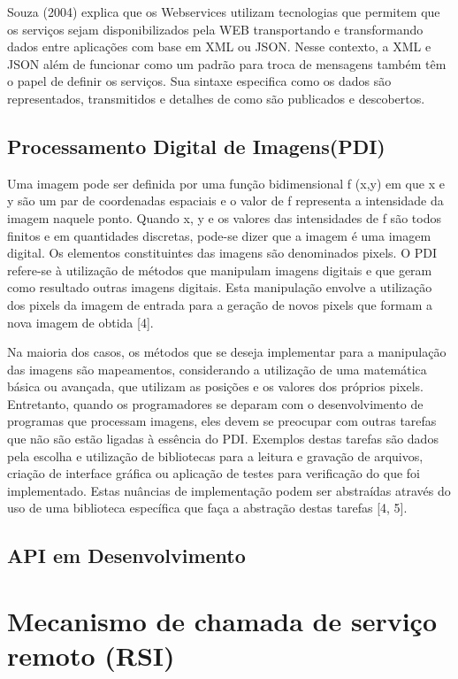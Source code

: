 \documentclass[12pt]{article}
\begin{document}
Souza (2004) explica que os Webservices utilizam tecnologias que permitem que
os serviços sejam disponibilizados pela WEB transportando e transformando dados
entre aplicações com base em XML ou JSON. Nesse contexto, a XML e JSON além de
funcionar como um padrão para troca de mensagens também têm o papel de definir os
serviços. Sua sintaxe especifica como os dados são representados, transmitidos e
detalhes de como são publicados e descobertos.

\subsection{Processamento Digital de Imagens(PDI)}

Uma imagem pode ser definida por uma função bidimensional f (x,y) em que x e y são um par de coordenadas espaciais e o valor de f representa a intensidade da
imagem naquele ponto. Quando x, y e os valores das intensidades de f são todos finitos e em quantidades discretas, pode-se dizer que a imagem é uma imagem
digital. Os elementos constituintes das imagens são denominados pixels. O PDI refere-se à utilização de métodos que manipulam imagens digitais e que geram
como resultado outras imagens digitais. Esta manipulação envolve a utilização dos pixels da imagem de entrada para a geração de novos pixels que formam a
nova imagem de obtida [4].

Na maioria dos casos, os métodos que se deseja implementar para a manipulação das imagens são mapeamentos, considerando a utilização de uma matemática
básica ou avançada, que utilizam as posições e os valores dos próprios pixels. Entretanto, quando os programadores se deparam com o desenvolvimento de
programas que processam imagens, eles devem se preocupar com outras tarefas que não são estão ligadas à essência do PDI. Exemplos destas tarefas são dados
pela escolha e utilização de bibliotecas para a leitura e gravação de arquivos, criação de interface gráfica ou aplicação de testes para verificação do que foi
implementado. Estas nuâncias de implementação podem ser abstraídas através do uso de uma biblioteca específica que faça a abstração destas tarefas [4, 5].

\subsection{API em Desenvolvimento}


\section{Mecanismo de chamada de serviço remoto (RSI)}
\end{document}

